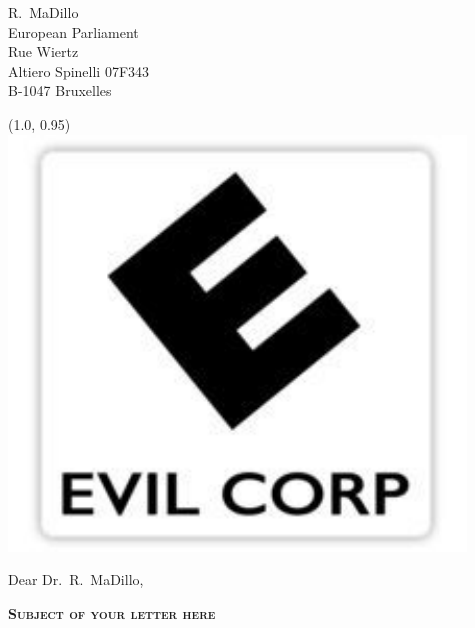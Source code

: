 \documentclass[a4paper,12pt]{letter}
\date{February 31, 2013}
\begin{document}
\begin{letter}{
	R.\ MaDillo\\
	European Parliament\\
	Rue Wiertz\\
	Altiero Spinelli 07F343\\
	B-1047 Bruxelles 
}

\begin{textblock}{10}(1.0, 0.95)
	\includegraphics[scale=0.4]{docs/letter_logo}
\end{textblock}

\opening{Dear Dr.\ R.\ MaDillo,}
{
\begin{center}
	\textbf{\textsc{Subject of your letter here}}\\[2em]
\end{center}
}

% 
%
%


\end{letter}
\end{document}
